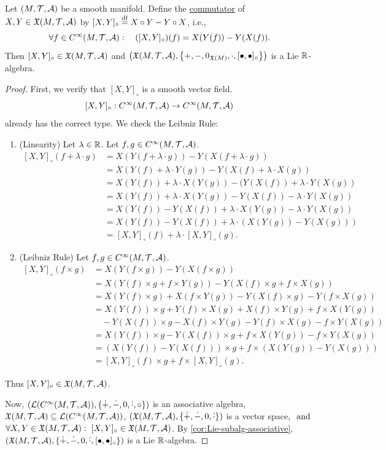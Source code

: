 \documentclass[11pt,reqno]{amsart}
\newcommand{\pwplus}{\mathbin{\dot{+}}}
\newcommand{\pwminus}{\mathbin{\dot{-}}}
\newcommand{\pwcdot}{\mathbin{\dot{\cdot}}}
\begin{document}
\begin{Thm}\label{thm:vector-fields-lie-algebra}
Let $(M,\mathcal{T},\mathcal{A})$ be a smooth manifold.
Define the \ul{commutator} of $X,Y\in\mathfrak{X}(M,\mathcal{T},\mathcal{A})$ by
$[X,Y]_\circ\stackrel{\mathrm{df}}{=} X\circ Y-Y\circ X$, i.e.,
\[\forall f\in C^\infty(M,\T,\A):\quad
\Func{[X,Y]_\circ}{f}=X(Y(f))-Y(X(f)).\]
Then $[X,Y]_\circ\in\mathfrak{X}(M,\mathcal{T},\mathcal{A})$ and
$\Br{\X(M,\T,\A),\set{+,-,0_{\X(M)},\cdot,[\bullet,\bullet]_\circ}}$
is a Lie $\mathbb{R}$-algebra.
\end{Thm}
\begin{proof}
First, we verify that $[X,Y]_\circ$ is a smooth vector field.
\[
[X,Y]_\circ:C^\infty(M,\mathcal{T},\mathcal{A})\to C^\infty(M,\mathcal{T},\mathcal{A})
\]
already has the correct type. We check the Leibniz Rule:
\begin{enumerate}
\item (Linearity)
Let $\lambda\in\mathbb{R}$. Let $f,g\in C^\infty(M,\mathcal{T},\mathcal{A})$.
\[\begin{aligned}
[X,Y]_\circ(f+\lambda\cdot g)
&=X(Y(f+\lambda\cdot g))-Y(X(f+\lambda\cdot g))\\
&=X(Y(f)+\lambda\cdot Y(g))-Y(X(f)+\lambda\cdot X(g))\\
&=X(Y(f))+\lambda\cdot X(Y(g))-(Y(X(f))+\lambda\cdot Y(X(g))\\
&=X(Y(f))+\lambda\cdot X(Y(g))-Y(X(f))-\lambda\cdot Y(X(g))\\
&=X(Y(f))-Y(X(f))+\lambda\cdot X(Y(g))-\lambda\cdot Y(X(g))\\
&=X(Y(f))-Y(X(f))+\lambda\cdot (X(Y(g))-Y(X(g)))\\
&=[X,Y]_\circ(f)+\lambda\cdot[X,Y]_\circ(g).
\end{aligned}\]
\item (Leibniz Rule)
Let $f,g\in C^\infty(M,\mathcal{T},\mathcal{A})$.
\[\begin{aligned}
[X,Y]_\circ(f\times g)
&=X(Y(f\times g))-Y(X(f\times g))\\
&=X(Y(f)\times g+f\times Y(g))-Y(X(f)\times g+f\times X(g))\\
&=X(Y(f)\times g)+X(f\times Y(g))-Y(X(f)\times g)-Y(f\times X(g))\\
&=X(Y(f))\times g+Y(f)\times X(g)+X(f)\times Y(g)+f\times X(Y(g))\\
&\quad-Y(X(f))\times g-X(f)\times Y(g)-Y(f)\times X(g)-f\times Y(X(g))\\
&=X(Y(f))\times g-Y(X(f))\times g+f\times X(Y(g))-f\times Y(X(g))\\
&=(X(Y(f))-Y(X(f)))\times g+f\times(X(Y(g))-Y(X(g)))\\
&=[X,Y]_\circ(f)\times g+f\times[X,Y]_\circ(g).
\end{aligned}\]
\end{enumerate}
Thus $[X,Y]_\circ\in\mathfrak{X}(M,\mathcal{T},\mathcal{A})$.

Now,
$\Br{\L\Br{C^\infty(M,\T,\A)},\set{\pwplus,\pwminus,0,\pwcdot,\circ}}$
is an associative algebra,
$\X(M,\T,\A)\subseteq\L\Br{C^\infty(M,\T,\A)}$,
$\Br{\X(M,\T,\A),\set{\pwplus,\pwminus,0,\pwcdot}}$ is a vector space,
$~\mathrm{and}~$ $\forall X,Y\in\mathfrak{X}(M,\mathcal{T},\mathcal{A}):\;[X,Y]_\circ\in\mathfrak{X}(M,\mathcal{T},\mathcal{A})$.
By \ref{cor:Lie-subalg-associative},
$\Br{\X(M,\T,\A),\set{\pwplus,\pwminus,0,\pwcdot,[\bullet,\bullet]_\circ}}$
is a Lie $\mathbb{R}$-algebra.
\end{proof}
\end{document}
